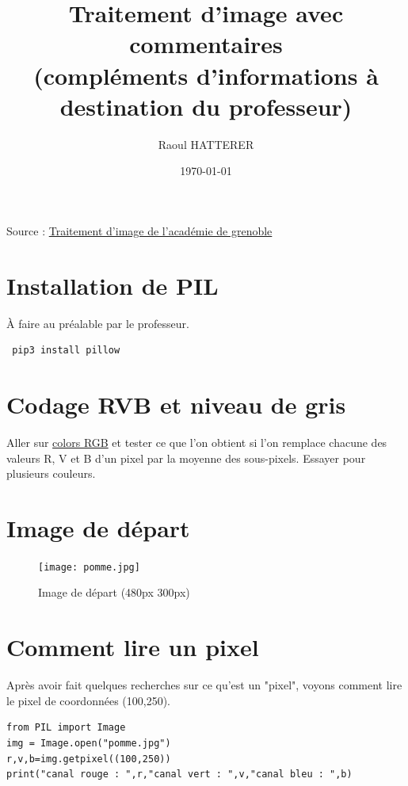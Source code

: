 \documentclass[11pt]{article}
\author{Raoul HATTERER}
\date{\today}
\title{Traitement d'image avec commentaires\\\medskip
\large (compléments d'informations à destination du professeur)}
\begin{document}
\maketitle
\tableofcontents

Source : \href{http://www.ac-grenoble.fr/disciplines/informatiquelycee/n\_site/snt\_photo\_transImg.html}{Traitement d'image de l'académie de grenoble}

\section{Installation de PIL}
\label{sec:orge25863d}

À faire au préalable par le professeur.

\begin{verbatim}
 pip3 install pillow
\end{verbatim}



\section{Codage RVB et niveau de gris}
\label{sec:orgfba8e4a}

Aller sur \href{https://www.w3schools.com/colors/colors\_rgb.asp}{colors RGB} et tester ce que l'on obtient si l'on remplace chacune des valeurs R, V et B d'un pixel par la moyenne des sous-pixels.
Essayer pour plusieurs couleurs.

\section{Image de départ}
\label{sec:org3c6010e}

\begin{figure}[htbp]
\centering
\texttt{[image: pomme.jpg]}
\caption{Image de départ (480px \texttimes{} 300px)}
\end{figure}


\section{Comment lire un pixel}
\label{sec:orgf8ac23b}

Après avoir fait quelques recherches sur ce qu'est un "pixel", voyons comment lire le pixel de coordonnées (100,250).

\begin{verbatim}
from PIL import Image
img = Image.open("pomme.jpg")
r,v,b=img.getpixel((100,250))
print("canal rouge : ",r,"canal vert : ",v,"canal bleu : ",b)
\end{verbatim}
\end{document}
